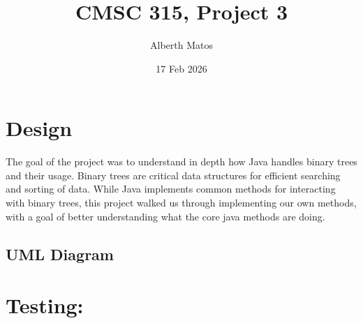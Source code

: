 \documentclass{scrartcl}
\title{CMSC 315, Project 3}
\author{Alberth Matos}
\date{17 Feb 2026}
\begin{document}
\maketitle
\tableofcontents
\thispagestyle{empty}
\newpage
\section{Design}
The goal of the project was to understand in depth how Java handles binary trees
and their usage. Binary trees are critical data structures for efficient
searching and sorting of data. While Java implements common methods for
interacting with binary trees, this project walked us through implementing
our own methods, with a goal of better understanding what the core java
methods are doing.
\\
\subsection{UML Diagram}

\newpage
\section{Testing:}
\end{document}
